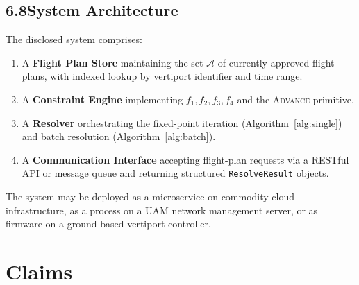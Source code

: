 \documentclass[12pt,a4paper]{article}
\begin{document}
\bigskip
\subsection*{6.8\quad System Architecture}

The disclosed system comprises:

\begin{enumerate}[label=(\Alph*)]
  \item A \textbf{Flight Plan Store} maintaining the set $\mathcal{A}$ of
    currently approved flight plans, with indexed lookup by vertiport
    identifier and time range.

  \item A \textbf{Constraint Engine} implementing $f_1, f_2, f_3, f_4$ and
    the \textsc{Advance} primitive.

  \item A \textbf{Resolver} orchestrating the fixed-point iteration
    (Algorithm~\ref{alg:single}) and batch resolution
    (Algorithm~\ref{alg:batch}).

  \item A \textbf{Communication Interface} accepting flight-plan requests via
    a RESTful API or message queue and returning structured
    \texttt{ResolveResult} objects.
\end{enumerate}

The system may be deployed as a microservice on commodity cloud infrastructure,
as a process on a UAM network management server, or as firmware on a
ground-based vertiport controller.

\section{Claims}
\end{document}
